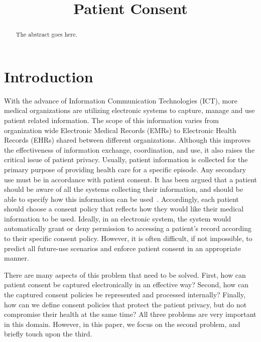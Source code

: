 \documentclass[conference]{IEEEtran}
\begin{document}
\title{Patient Consent}

\author{
}

\maketitle


\begin{abstract}
The abstract goes here.
\end{abstract}



\section{Introduction}
With the advance of Information Communication Technologies (ICT), more medical organizations are utilizing electronic systems to capture, manage and use patient
related information.  The scope of this information varies from organization wide Electronic Medical Records (EMRs) to Electronic Health Records (EHRs) shared
between different organizations.  Although this improves the effectiveness of information exchange, coordination, and use, it also raises the critical issue of
patient privacy. Usually, patient information is collected for the primary purpose of providing health care for a specific episode. Any secondary use must be in
accordance with patient consent.  It has been argued that a patient should be aware of all the systems collecting their information, and should be able to
specify how this information can be used~\cite{kluge2004informed}. Accordingly, each patient should choose a consent policy that reflects how they would like
their medical information to be used. Ideally, in an electronic system, the system would automatically grant or deny permission to
accessing a patient's record according to their specific consent policy. However, it is often difficult, if not impossible, to predict all future-use scenarios
and enforce patient consent in an appropriate manner.

There are many aspects of this problem that need to be solved. First, how can patient consent be captured electronically in an effective way? Second, how can
the captured consent policies be represented and processed internally? Finally, how can we define consent policies that protect the patient privacy, but do not
compromise their health at the same time? All three problems are very important in this domain. However, in this paper, we focus on the second problem, and
briefly touch upon the third.
\end{document}
